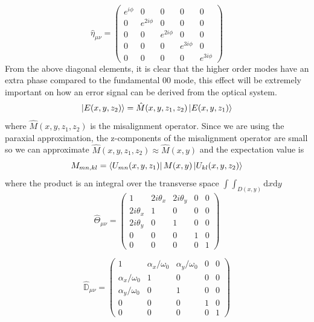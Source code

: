 		\begin{equation} \label{GouyPhaseMatrix}
		\hat{\eta}_{\mu \nu} = 
		\begin{pmatrix}
		e^{i\phi}	&0			&0			& 0 			& 0
		\\ 0		&e^{2i\phi}	&0			& 0				& 0
		\\ 0		&0			&e^{2i\phi}	& 0				& 0
		\\ 0		&0			&0			& e^{3i\phi}	& 0
		\\ 0		&0			&0			& 0				& e^{3i\phi}
		\end{pmatrix}
		\end{equation}
		From the above diagonal elements, it is clear that the higher order modes have an extra phase compared to the fundamental 00 mode, this effect will be extremely important on how an error signal can be derived from the optical system.
		\begin{equation}
		\ket{E(x,y,z_2)} = \hat{M}(x,y,z_1,z_2)	\ket{E(x,y,z_1)}
		\end{equation}
		where $\hat{M}(x,y,z_1,z_2)$ is the misalignment operator.  Since we are using the paraxial approximation, the z-components of the misalignment operator are small so we can approximate $\hat{M}{(x,y,z_1,z_2)} \approx \hat{M}(x,y)$ and the expectation value is
		\begin{equation}
		M_{mn,kl}=  \bra{U_{mn}(x,y,z_1)} M(x,y) \ket{U_{kl}(x,y,z_2)}
		\end{equation}
		where the product is an integral over the transverse space $\int \!\!\! \int_{D(x,y)} \text{d}x \text{d}y$
		\begin{equation} \label{misalign_matrix}
		\hat{\Theta}_{\mu \nu} = 
		\begin{pmatrix}
		   1			&2i\theta_x		&2i\theta_y		& 0 & 0
		\\ 2i\theta_x	&1				&0				& 0	& 0
		\\ 2i\theta_y	&0				&1				& 0	& 0
		\\ 0			&0				&0				& 1	& 0
		\\ 0			&0				&0				& 0	& 1
		\end{pmatrix}
		\end{equation}

		\begin{equation} \label{mistrans_matrix}
		\hat{\mathbb{D}}_{\mu \nu} = 
		\begin{pmatrix}
			1					&\alpha_x/\omega_{0}	&\alpha_y/\omega_{0}	& 0 & 0
		\\ \alpha_x/\omega_{0}	&1						&0						& 0 & 0
		\\ \alpha_y/\omega_{0}	&0						&1						& 0	& 0
		\\ 0					&0						&0						& 1	& 0
		\\ 0					&0						&0						& 0 & 1 
		\end{pmatrix}
		\end{equation}
		
